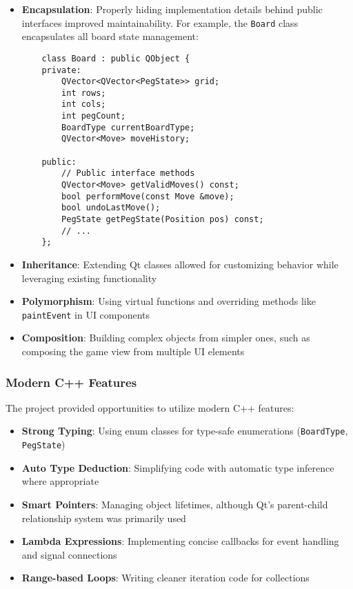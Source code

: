 \begin{itemize}
    \item \textbf{Encapsulation}: Properly hiding implementation details behind public interfaces improved maintainability. For example, the \texttt{Board} class encapsulates all board state management:
    
    \begin{verbatim}
    class Board : public QObject {
    private:
        QVector<QVector<PegState>> grid;
        int rows;
        int cols;
        int pegCount;
        BoardType currentBoardType;
        QVector<Move> moveHistory;
        
    public:
        // Public interface methods
        QVector<Move> getValidMoves() const;
        bool performMove(const Move &move);
        bool undoLastMove();
        PegState getPegState(Position pos) const;
        // ...
    };
    \end{verbatim}
    
    \item \textbf{Inheritance}: Extending Qt classes allowed for customizing behavior while leveraging existing functionality
    \item \textbf{Polymorphism}: Using virtual functions and overriding methods like \texttt{paintEvent} in UI components
    \item \textbf{Composition}: Building complex objects from simpler ones, such as composing the game view from multiple UI elements
\end{itemize}

\subsubsection{Modern C++ Features}
The project provided opportunities to utilize modern C++ features:

\begin{itemize}
    \item \textbf{Strong Typing}: Using enum classes for type-safe enumerations (\texttt{BoardType}, \texttt{PegState})
    \item \textbf{Auto Type Deduction}: Simplifying code with automatic type inference where appropriate
    \item \textbf{Smart Pointers}: Managing object lifetimes, although Qt's parent-child relationship system was primarily used
    \item \textbf{Lambda Expressions}: Implementing concise callbacks for event handling and signal connections
    \item \textbf{Range-based Loops}: Writing cleaner iteration code for collections
\end{itemize}

